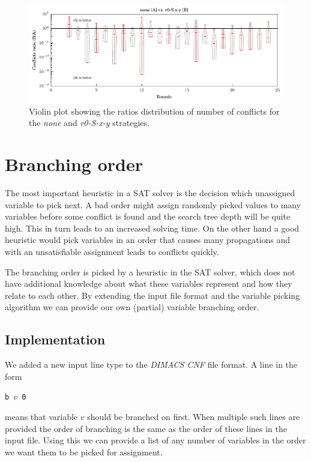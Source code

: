 \begin{figure}
\centering \includegraphics{figures/bo-ex1/ratio-confl-none-r0sxy.pdf}
\caption{Violin plot showing the ratios distribution of number of conflicts for the \emph{none} and \emph{r0-S-x-y} strategies.}
\label{fig:bo-ratio-confl-none-r0sxy}
\end{figure}

\section{Branching order}
\label{sec:branching-order}

The most important heuristic in a SAT solver is the decision which unassigned variable to pick next.
A bad order might assign randomly picked values to many variables before some conflict is found and the search tree depth will be quite high.
This in turn leads to an increased solving time.
On the other hand a good heuristic would pick variables in an order that causes many propagations and with an unsatisfiable assignment leads to conflicts quickly.

The branching order is picked by a heuristic in the SAT solver, which does not have additional knowledge about what these variables represent and how they relate to each other.
By extending the input file format and the variable picking algorithm we can provide our own (partial) variable branching order.

\subsection{Implementation}
\label{sec:branching-order-impl}
We added a new input line type to the \emph{DIMACS CNF} file format.
A line in the form

\centerline{\texttt{b $v$ 0}}

\noindent means that variable $v$ should be branched on first.
When multiple such lines are provided the order of branching is the same as the order of these lines in the input file.
Using this we can provide a list of any number of variables in the order we want them to be picked for assignment.

